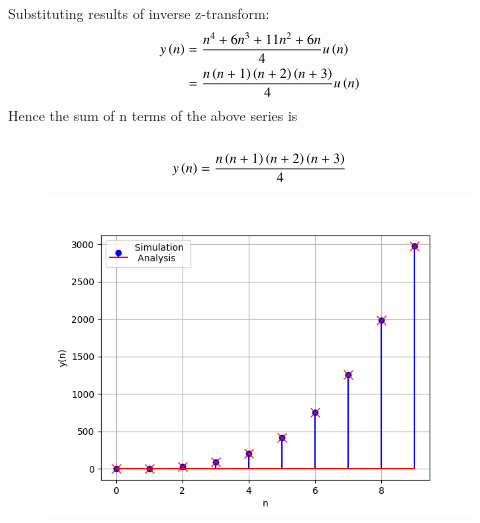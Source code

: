\documentclass[journal,12pt,twocolumn]{IEEEtran}
\theoremstyle{remark}
\begin{document}
Substituting results of inverse z-transform:
\begin{align}
 y\left(n\right) &= \frac{n^4 + 6n^3 + 11n^2 + 6n}{4}u\left(n\right)\\
    &= \frac{n\left(n+1\right)\left(n+2\right)\left(n+3\right)}{4}u\left(n\right)
\end{align}
Hence the sum of n terms of the above series is \\\\
\begin{align}
y \left(n\right) = \frac{n \left(n+1\right) \left(n+2\right) \left(n+3\right)}{4}
\end{align}
\begin{figure}[ht]
    \centering
    \includegraphics[width=\columnwidth]{ncert-maths/11/9/4/2/figs/fig7.png}
    \label{fig: 10.5.3.12696}
\end{figure}
\end{document}
